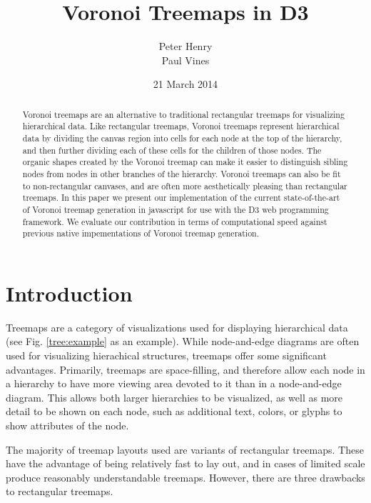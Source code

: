 \documentclass{acm_proc_article-sp} \usepackage{cite}
\begin{document}
\title{Voronoi Treemaps in D3}

 \author{ \alignauthor Peter Henry
  \\ 
  \alignauthor Paul Vines \\  } \date{21 March
  2014}

\maketitle
\begin{abstract}
Voronoi treemaps are an alternative to traditional rectangular
treemaps for visualizing hierarchical data. Like rectangular treemaps,
Voronoi treemaps represent hierarchical data by dividing the canvas
region into cells for each node at the top of the hierarchy, and then
further dividing each of these cells for the children of those
nodes. The organic shapes created by the Voronoi treemap can make it easier
to distinguish sibling nodes from nodes in other branches of the
hierarchy. Voronoi treemaps can also be fit to non-rectangular
canvases, and are often more aesthetically pleasing than rectangular treemaps. In this paper we
present our implementation of the current state-of-the-art of Voronoi
treemap generation in javascript for use with the D3 web programming
framework. We evaluate our contribution in terms of computational
speed against previous native impementations of Voronoi treemap
generation.
\end{abstract}

\section{Introduction}
\label{sec:introduction}
Treemaps are a category of visualizations used for displaying
hierarchical data (see Fig. \ref{tree:example} as an example). While
node-and-edge diagrams are often used for visualizing hierachical
structures, treemaps offer some significant advantages. Primarily,
treemaps are space-filling, and therefore allow each node in a
hierarchy to have more viewing area devoted to it than in a
node-and-edge diagram. This allows both larger hierarchies to be
visualized, as well as more detail to be shown on each node, such as
additional text, colors, or glyphs to show attributes of the node.

The majority of treemap layouts used are variants of rectangular
treemaps. These have the advantage of being relatively fast to lay out,
and in cases of limited scale produce reasonably understandable
treemaps. However, there are three drawbacks to rectangular treemaps.
\end{document}
